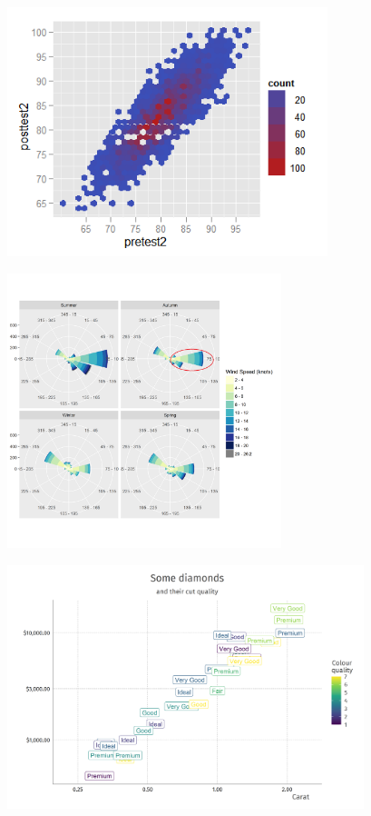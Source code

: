 \documentclass[xcolor=table,aspectratio=169]{beamer}
\begin{document}
\begin{frame}
  \includegraphics[width=0.7\textwidth]{pics/plot3.png}
\end{frame}

\begin{frame}
  \includegraphics[width=0.6\textwidth]{pics/wind.png}
\end{frame}

\begin{frame}
	\includegraphics[width=0.78\textwidth]{pics/ggdiamonds.png}
\end{frame}
\end{document}
